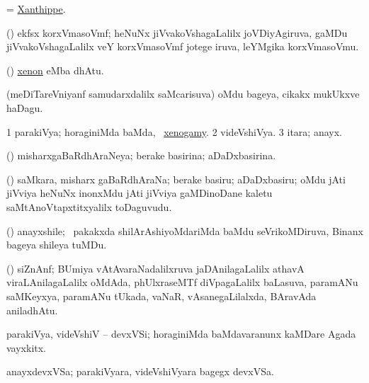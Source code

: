 \bentry
{} 
\gl{\nA}
\bmng
= \hyperlink{Xanthippe}{Xanthippe}.
\emng
\eentry


\bentry
{} 
\gl{\nA} 
\bmng
(\jiVvi) ekfsx korxVmasoVmf; heNuNx jiVvakoVshagaLalilx joVDiyAgiruva, gaMDu jiVvakoVshagaLalilx veY  korxVmasoVmf jotege iruva, leYMgika korxVmasoVmu.
\emng  
\eentry

\bentry
{} 
\gl{\saMkiSx}
\bmng
{}
\emng
\eentry

\bentry
{}
\gl{\saMkeV}
\bmng
(\ravi) \hyperlink{xenon}{xenon} eMba dhAtu.
\emng
\eentry

\bentry
{} 
\gl{\nA} 
\bmng
(meDiTareVniyanf samudarxdalilx saMcarisuva) oMdu bageya, cikakx mukUkxve haDagu. \quad {}
\emng
\eentry

\bentry
{} 
\gl{\sapUpa} 
\bmng
\bnum
\num{1} parakiVya; horaginiMda baMda, \udA\ \hyperlink{xenogamy}{xenogamy}.  
\num{2} videVshiVya. 
\num{3} itara; anayx.
\enum
\emng
\eentry

\bentry
{} 
\gl{\gu} 
\bmng
(\jiVvi) misharxgaBaRdhAraNeya; berake basirina; aDaDxbasirina.
\emng
\eentry

\bentry
{} 
\gl{\nA} 
\bmng
(\jiVvi) saMkara, misharx gaBaRdhAraNa; berake basiru; aDaDxbasiru; oMdu jAti jiVviya heNuNx inonxMdu jAti jiVviya gaMDinoDane kaletu saMtAnoVtapxtitxyalilx toDaguvudu.
\emng
\eentry

\bentry
{} 
\gl{\nA} 
\bmng
(\BUvi) anayxshile; \sA\ pakakxda shilArAshiyoMdariMda baMdu  seVrikoMDiruva, Binanx bageya shileya tuMDu.
\emng 
\eentry

\bentry
{} 
\gl{\nA}
\bmng
(\ravi) siZnAnf; BUmiya vAtAvaraNadalilxruva  jaDAnilagaLalilx athavA viraLAnilagaLalilx oMdAda, phUlxraseMTf  diVpagaLalilx baLasuva,  paramANu  saMKeyxya,  paramANu tUkada, vaNaR, vAsanegaLilalxda, BAravAda  aniladhAtu.
\emng  
\eentry

\bentry
{} 
\gl{\nA} 
\bmng
parakiVya, videVshiV -- devxVSi; horaginiMda  baMdavaranunx kaMDare Agada vayxkitx.
\emng  
\eentry

\bentry
{} 
\gl{\nA}
\bmng
anayxdevxVSa; parakiVyara, videVshiVyara bagegx devxVSa.
\emng
\eentry

